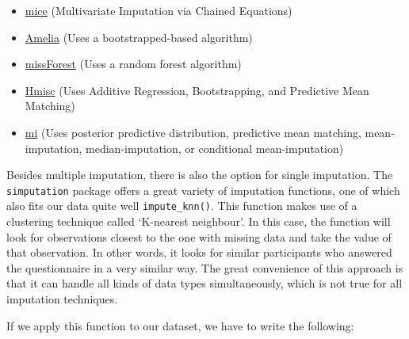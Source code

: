 \documentclass[
]{book}
\begin{document}
\begin{itemize}
\item
  \href{https://cran.r-project.org/web/packages/Amelia/index.html}{mice} (Multivariate Imputation via Chained Equations)
\item
  \href{https://cran.r-project.org/web/packages/Amelia/index.html}{Amelia} (Uses a bootstrapped-based algorithm)
\item
  \href{https://cran.r-project.org/web/packages/missForest/index.html}{missForest} (Uses a random forest algorithm)
\item
  \href{https://cran.r-project.org/web/packages/Hmisc/index.html}{Hmisc} (Uses Additive Regression, Bootstrapping, and Predictive Mean Matching)
\item
  \href{https://cran.r-project.org/web/packages/mi/index.html}{mi} (Uses posterior predictive distribution, predictive mean matching, mean-imputation, median-imputation, or conditional mean-imputation)
\end{itemize}

Besides multiple imputation, there is also the option for single imputation. The \texttt{simputation} package offers a great variety of imputation functions, one of which also fits our data quite well \texttt{impute\_knn()}. This function makes use of a clustering technique called `K-nearest neighbour'. In this case, the function will look for observations closest to the one with missing data and take the value of that observation. In other words, it looks for similar participants who answered the questionnaire in a very similar way. The great convenience of this approach is that it can handle all kinds of data types simultaneously, which is not true for all imputation techniques.

If we apply this function to our dataset, we have to write the following:
\end{document}
